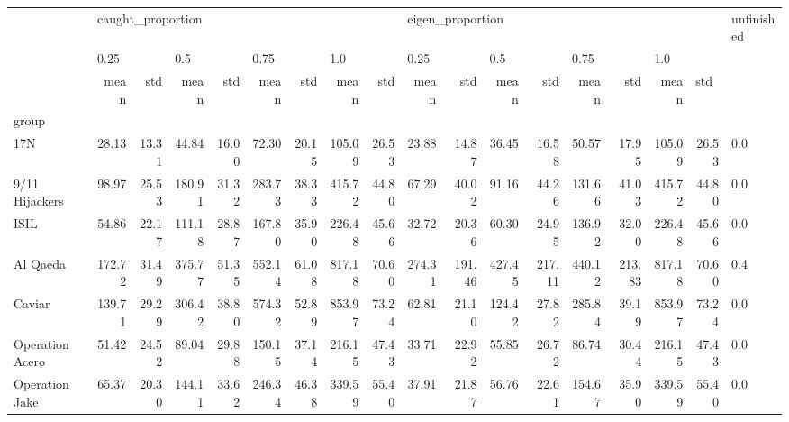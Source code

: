 \begin{tabular}{lrrrrrrrrrrrrrrrrl}
\toprule
{} & \multicolumn{8}{l}{caught\_proportion} & \multicolumn{8}{l}{eigen\_proportion} & unfinished \\
{} & \multicolumn{2}{l}{0.25} & \multicolumn{2}{l}{0.5} & \multicolumn{2}{l}{0.75} & \multicolumn{2}{l}{1.0} & \multicolumn{2}{l}{0.25} & \multicolumn{2}{l}{0.5} & \multicolumn{2}{l}{0.75} & \multicolumn{3}{l}{1.0} \\
{} &              mean &    std &    mean &    std &    mean &    std &    mean &    std &             mean &     std &    mean &     std &    mean &     std &    mean & \multicolumn{2}{l}{std} \\
group                &                   &        &         &        &         &        &         &        &                  &         &         &         &         &         &         &        &            \\
\midrule
17N                  &             28.13 &  13.31 &   44.84 &  16.00 &   72.30 &  20.15 &  105.09 &  26.53 &            23.88 &   14.87 &   36.45 &   16.58 &   50.57 &   17.95 &  105.09 &  26.53 &        0.0 \\
9/11 Hijackers       &             98.97 &  25.53 &  180.91 &  31.32 &  283.73 &  38.33 &  415.72 &  44.80 &            67.29 &   40.02 &   91.16 &   44.26 &  131.66 &   41.03 &  415.72 &  44.80 &        0.0 \\
ISIL                 &             54.86 &  22.17 &  111.18 &  28.87 &  167.80 &  35.90 &  226.48 &  45.66 &            32.72 &   20.36 &   60.30 &   24.95 &  136.92 &   32.00 &  226.48 &  45.66 &        0.0 \\
Al Qaeda             &            172.72 &  31.49 &  375.77 &  51.35 &  552.14 &  61.08 &  817.18 &  70.60 &           274.31 &  191.46 &  427.45 &  217.11 &  440.12 &  213.83 &  817.18 &  70.60 &        0.4 \\
Caviar               &            139.71 &  29.29 &  306.42 &  38.80 &  574.32 &  52.89 &  853.97 &  73.24 &            62.81 &   21.10 &  124.42 &   27.82 &  285.84 &   39.19 &  853.97 &  73.24 &        0.0 \\
Operation Acero      &             51.42 &  24.52 &   89.04 &  29.88 &  150.15 &  37.14 &  216.15 &  47.43 &            33.71 &   22.92 &   55.85 &   26.72 &   86.74 &   30.44 &  216.15 &  47.43 &        0.0 \\
Operation Jake       &             65.37 &  20.30 &  144.11 &  33.62 &  246.34 &  46.38 &  339.59 &  55.40 &            37.91 &   21.87 &   56.76 &   22.61 &  154.67 &   35.90 &  339.59 &  55.40 &        0.0 \\

\end{tabular}
